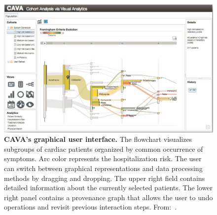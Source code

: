 \documentclass[
  oneside]{book}
\begin{document}
\begin{figure}[h]

{\centering \includegraphics[width=0.8\linewidth]{figures/03-cava} 

}

\caption{\textbf{CAVA's graphical user interface.} The flowchart visualizes subgroups of cardiac patients organized by common occurrence of symptoms. Arc color represents the hospitalization risk. The user can switch between graphical representations and data processing methods by dragging and dropping. The upper right field contains detailed information about the currently selected patients. The lower right panel contains a provenance graph that allows the user to undo operations and revisit previous interaction steps. From:~\autocite{Zhang:CAVA2015}.}\label{fig:03-cava}
\end{figure}
\end{document}
